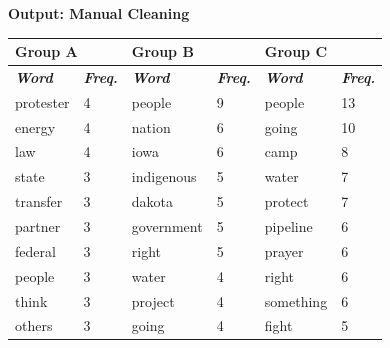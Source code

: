 \textbf{Output: Manual Cleaning}

\begin{footnotesize}


\begin{table}[H]
\begin{tabular}{|l|l|l|l|l|l|}
\hline
\multicolumn{2}{|l|}{\textbf{Group A}}           & \multicolumn{2}{l|}{\textbf{Group B}}            & \multicolumn{2}{l|}{\textbf{Group C}}            \\ \hline
\textit{\textbf{Word}} & \textit{\textbf{Freq.}} & \textit{\textbf{Word}} & \textit{\textbf{Freq.}} & \textit{\textbf{Word}} & \textit{\textbf{Freq.}} \\ \hline
protester              & 4                       & people                 & 9                       & people                 & 13                      \\ \hline
energy                 & 4                       & nation                 & 6                       & going                  & 10                      \\ \hline
law                    & 4                       & iowa                   & 6                       & camp                   & 8                       \\ \hline
state                  & 3                       & indigenous             & 5                       & water                  & 7                       \\ \hline
transfer               & 3                       & dakota                 & 5                       & protect                & 7                       \\ \hline
partner                & 3                       & government             & 5                       & pipeline               & 6                       \\ \hline
federal                & 3                       & right                  & 5                       & prayer                 & 6                       \\ \hline
people                 & 3                       & water                  & 4                       & right                  & 6                       \\ \hline
think                  & 3                       & project                & 4                       & something              & 6                       \\ \hline
others                 & 3                       & going                  & 4                       & fight                  & 5                       \\ \hline

\end{tabular}
\end{table}
\end{footnotesize}
